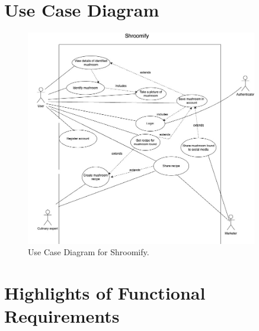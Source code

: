 \documentclass[]{article}
\begin{document}
\section{Use Case Diagram}
\label{sec:use_case_diagram}
\begin{figure}[H]
    \centering
    \includegraphics[width=0.9\textwidth]{3A04UseCaseDiagram.jpg}
    \caption{Use Case Diagram for Shroomify.}
    \label{fig:example}
\end{figure}

%
%
%

\section{Highlights of Functional Requirements}
\label{sec:functional_requirements}

\end{document}
